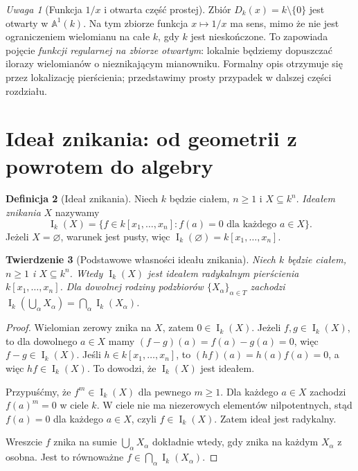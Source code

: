 \documentclass[11pt,a4paper,openany]{report}
\numberwithin{equation}{section}
\theoremstyle{plain}
\newtheorem{twierdzenie}{Twierdzenie}[section]
\theoremstyle{definition}
\newtheorem{definicja}[twierdzenie]{Definicja}
\theoremstyle{remark}
\newtheorem{uwaga}[twierdzenie]{Uwaga}
\newcommand{\A}{\mathbb A}
\newcommand{\I}{\operatorname I}
\begin{document}
\begin{uwaga}[Funkcja $1/x$ i otwarta część prostej]
Zbiór $D_k(x)=k\setminus\{0\}$ jest otwarty w $\A^1(k)$.
Na tym zbiorze funkcja $x\mapsto1/x$ ma sens, mimo że nie jest
ograniczeniem wielomianu na całe $k$, gdy $k$ jest nieskończone.
To zapowiada pojęcie \emph{funkcji regularnej na zbiorze otwartym}:
lokalnie będziemy dopuszczać ilorazy wielomianów o nieznikającym
mianowniku. Formalny opis otrzymuje się przez lokalizację pierścienia;
przedstawimy prosty przypadek w dalszej części rozdziału.
\end{uwaga}

\section{Ideał znikania: od geometrii z powrotem do algebry}

\begin{definicja}[Ideał znikania]
Niech $k$ będzie ciałem, $n\ge1$ i $X\subseteq k^n$.
\emph{Ideałem znikania} $X$ nazywamy
\[
\I_k(X)=\{f\in k[x_1,\dots,x_n]:f(a)=0\text{ dla każdego }a\in X\}.
\]
Jeżeli $X=\varnothing$, warunek jest pusty, więc
$\I_k(\varnothing)=k[x_1,\dots,x_n]$.
\end{definicja}

\begin{twierdzenie}[Podstawowe własności ideału znikania]
\label{tw:I-basic}
Niech $k$ będzie ciałem, $n\ge1$ i $X\subseteq k^n$.
Wtedy $\I_k(X)$ jest ideałem radykalnym pierścienia
$k[x_1,\dots,x_n]$. Dla dowolnej rodziny podzbiorów
$\{X_\alpha\}_{\alpha\in T}$ zachodzi
$\I_k(\bigcup_\alpha X_\alpha)=\bigcap_\alpha\I_k(X_\alpha)$.
\end{twierdzenie}
\begin{proof}
Wielomian zerowy znika na $X$, zatem $0\in\I_k(X)$.
Jeżeli $f,g\in\I_k(X)$, to dla dowolnego $a\in X$ mamy
$(f-g)(a)=f(a)-g(a)=0$, więc $f-g\in\I_k(X)$.
Jeśli $h\in k[x_1,\dots,x_n]$, to $(hf)(a)=h(a)f(a)=0$,
a więc $hf\in\I_k(X)$. To dowodzi, że $\I_k(X)$ jest ideałem.

Przypuśćmy, że $f^m\in\I_k(X)$ dla pewnego $m\ge1$.
Dla każdego $a\in X$ zachodzi $f(a)^m=0$ w ciele $k$.
W ciele nie ma niezerowych elementów nilpotentnych, stąd
$f(a)=0$ dla każdego $a\in X$, czyli $f\in\I_k(X)$.
Zatem ideał jest radykalny.

Wreszcie $f$ znika na sumie $\bigcup_\alpha X_\alpha$
dokładnie wtedy, gdy znika na każdym $X_\alpha$ z osobna.
Jest to równoważne $f\in\bigcap_\alpha\I_k(X_\alpha)$.
\end{proof}
\end{document}
